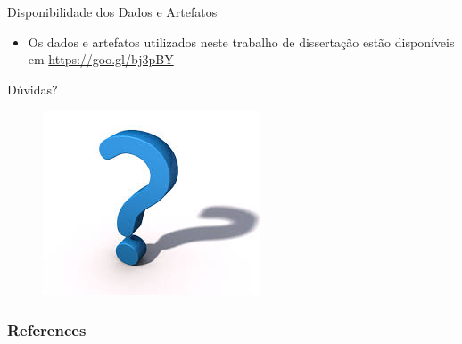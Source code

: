 \documentclass[t,14pt,mathserif]{beamer}
\begin{document}
\begin{frame}{Disponibilidade dos Dados e Artefatos}
    \begin{itemize}

        \item Os dados e artefatos utilizados neste trabalho de dissertação
            estão disponíveis em \url{https://goo.gl/bj3pBY}

    \end{itemize}
\end{frame}

\begin{frame}{Dúvidas?}
	\begin{figure}[hbtp]
		\centering
	    \includegraphics[scale=1]{../img/questions.jpg}
	\end{figure}
\end{frame}

\begin{frame}[allowframebreaks]
   \frametitle{References}
   
   
\end{frame}
\end{document}
